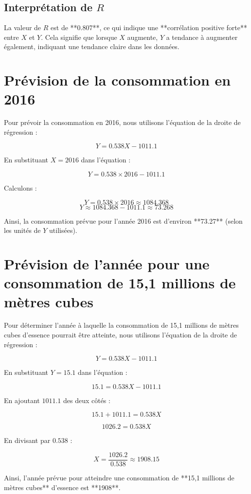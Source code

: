 \documentclass[12pt]{article}
\begin{document}
\subsection*{Interprétation de \(R\)}

La valeur de \(R\) est de **0.807**, ce qui indique une **corrélation positive forte** entre \(X\) et \(Y\). Cela signifie que lorsque \(X\) augmente, \(Y\) a tendance à augmenter également, indiquant une tendance claire dans les données.

\section*{Prévision de la consommation en 2016}

Pour prévoir la consommation en 2016, nous utilisons l'équation de la droite de régression :

\[
Y = 0.538X - 1011.1
\]

En substituant \(X = 2016\) dans l'équation :

\[
Y = 0.538 \times 2016 - 1011.1
\]

Calculons :

\[
Y = 0.538 \times 2016 \approx 1084.368
\]
\[
Y \approx 1084.368 - 1011.1 \approx 73.268
\]

Ainsi, la consommation prévue pour l'année 2016 est d'environ **73.27** (selon les unités de \(Y\) utilisées).
\section*{Prévision de l'année pour une consommation de 15,1 millions de mètres cubes}

Pour déterminer l'année à laquelle la consommation de 15,1 millions de mètres cubes d'essence pourrait être atteinte, nous utilisons l'équation de la droite de régression :

\[
Y = 0.538X - 1011.1
\]

En substituant \(Y = 15.1\) dans l'équation :

\[
15.1 = 0.538X - 1011.1
\]

En ajoutant \(1011.1\) des deux côtés :

\[
15.1 + 1011.1 = 0.538X
\]

\[
1026.2 = 0.538X
\]

En divisant par \(0.538\) :

\[
X = \frac{1026.2}{0.538} \approx 1908.15
\]

Ainsi, l'année prévue pour atteindre une consommation de **15,1 millions de mètres cubes** d'essence est **1908**.
\end{document}
